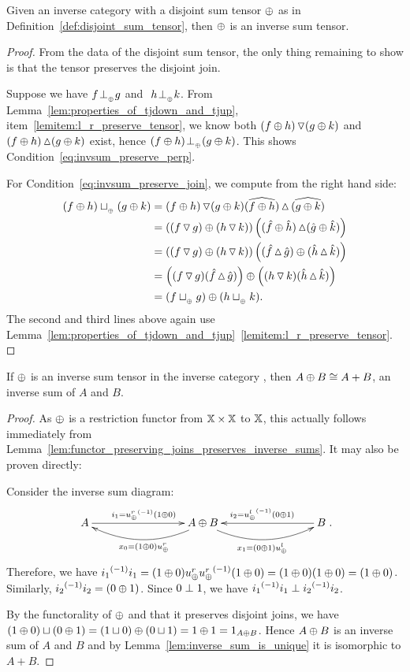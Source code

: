 \begin{lemma}\label{lem:a_disjoint_sum_tensor_is_an_inverse_sum_tensor}
  Given an inverse category \X with a disjoint sum tensor $\oplus$ as in
  Definition~\ref{def:disjoint_sum_tensor}, then $\oplus$ is an inverse sum tensor.
\end{lemma}
\begin{proof}
  From the data of the disjoint sum tensor, the only thing remaining to show is that the tensor
  preserves the disjoint join.

  Suppose we have $f {}_{{}_{}}{\perp_{{}_{\oplus}}} g$ and $\ h {}_{{}_{}}{\perp_{{}_{\oplus}}} k$.
  From Lemma~\ref{lem:properties_of_tjdown_and_tjup}, item~\ref{lemitem:l_r_preserve_tensor}, we
  know both $(f\oplus h)\operatorname{\triangledown}(g\oplus k)$ and $(f\oplus h)\operatorname{\vartriangle}(g\oplus k)$ exist, hence $(f\oplus h){}_{{}_{}}{\perp_{{}_{\oplus}}}(g\oplus k)$.
  This shows Condition~\ref{eq:invsum_preserve_perp}.

  For Condition~\ref{eq:invsum_preserve_join}, we compute from the right hand side:
  \begin{align*}
    (f\oplus h)\sqcup_{{_{\oplus}}}(g\oplus k) &= (f\oplus h)\operatorname{\triangledown} (g\oplus k) \widehat{(f\oplus h)}\operatorname{\vartriangle} \widehat{(g\oplus k)}\\
    &= \left( (f\operatorname{\triangledown} g)\oplus (h \operatorname{\triangledown} k) \right)
       \left( (\hat{f}\oplus\hat{h}) \operatorname{\vartriangle} (\hat{g}\oplus\hat{k}) \right) \\
    &= \left( (f\operatorname{\triangledown} g)\oplus (h \operatorname{\triangledown} k) \right)
       \left( (\hat{f}\operatorname{\vartriangle} \hat{g}) \oplus (\hat{h}\operatorname{\vartriangle}\hat{k}) \right) \\
    &= \left( (f\operatorname{\triangledown} g)(\hat{f}\operatorname{\vartriangle} \hat{g})\right) \oplus
       \left((h \operatorname{\triangledown} k) (\hat{h}\operatorname{\vartriangle}\hat{k}) \right) \\
    &=  (f\sqcup_{{_{\oplus}}} g)\oplus(h \sqcup_{{_{\oplus}}} k).
  \end{align*}
  The second and third lines above again use
  Lemma~\ref{lem:properties_of_tjdown_and_tjup}~\ref{lemitem:l_r_preserve_tensor}.

\end{proof}

\begin{lemma}\label{lem:an_inverse_sum_tensor_gives_inverse_sums}
  If $\oplus$ is an inverse sum tensor in the inverse category \X, then $A\oplus B \cong A+B$, an inverse
  sum of $A$ and $B$.
\end{lemma}
\begin{proof}
  As $\oplus$ is a restriction functor from $\mathbb{X}\times\mathbb{X}$ to $\mathbb{X}$, this actually follows immediately
  from Lemma~\ref{lem:functor_preserving_joins_preserves_inverse_sums}. It may also be proven
  directly:

  Consider the inverse sum diagram:
  \[
    \xymatrix @C+60pt{
      A\ar[r]^{i_1=\inv{\upr} (1\+0)}
        & A\+B \ar@/^15pt/[l]^{x_0=(1\+0)\upr} \ar@/_15pt/[r]_{x_1=(0\+1)\upl}
          & B \ar[l]_{i_2=\inv{\upl} (0\+1)}
    }.
  \]
  Therefore, we have ${i_1}^{(-1)}i_1 =
  (1\oplus0)u_{\oplus}^r {u_{\oplus}^r}^{(-1)} (1\oplus0) = (1\oplus0)(1\oplus0) = (1\oplus0)$. Similarly, ${i_2}^{(-1)} i_2 = (0\oplus1)$.
  Since $0\perp 1$, we have ${i_1}^{(-1)}i_1 \perp {i_2}^{(-1)} i_2$.

  By the functorality of $\oplus$ and that it preserves disjoint joins, we have $(1\oplus0) \sqcup (0 \oplus1)
  = (1\sqcup 0 ) \oplus (0\sqcup 1) = 1 \oplus 1 = 1_{A\oplus B}$. Hence $A\oplus B$ is an inverse sum of $A$ and
  $B$ and by Lemma~\ref{lem:inverse_sum_is_unique} it is isomorphic to $A+B$.
\end{proof}

